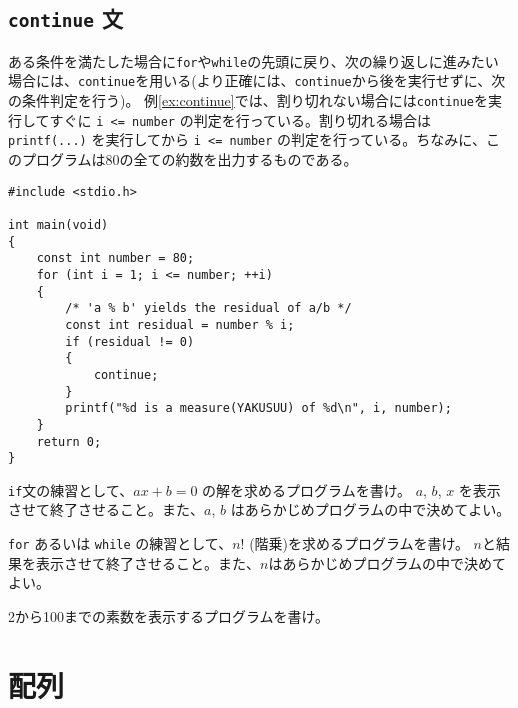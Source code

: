 \subsection{\texttt{continue} 文}
ある条件を満たした場合に\texttt{for}や\texttt{while}の先頭に戻り、次の繰り返しに進みたい場合には、\texttt{continue}を用いる(より正確には、\texttt{continue}から後を実行せずに、次の条件判定を行う)。 例\ref{ex:continue}では、割り切れない場合には\texttt{continue}を実行してすぐに \texttt{i <= number} の判定を行っている。割り切れる場合は \texttt{printf(...)} を実行してから \texttt{i <= number} の判定を行っている。ちなみに、このプログラムは80の全ての約数を出力するものである。
\begin{reidai}\label{ex:continue}
    \begin{verbatim}
#include <stdio.h>

int main(void)
{
    const int number = 80;
    for (int i = 1; i <= number; ++i)
    {
        /* 'a % b' yields the residual of a/b */
        const int residual = number % i;
        if (residual != 0)
        {
            continue;
        }
        printf("%d is a measure(YAKUSUU) of %d\n", i, number);
    }
    return 0;
}
\end{verbatim}
\end{reidai}
\begin{renshuu}\label{prob:2-1}
    \texttt{if}文の練習として、\(ax+b=0\) の解を求めるプログラムを書け。
    \(a\), \(b\), \(x\) を表示させて終了させること。また、\(a\), \(b\) はあらかじめプログラムの中で決めてよい。
\end{renshuu}

\begin{renshuu}\label{prob:2-2}
    \texttt{for} あるいは \texttt{while} の練習として、\(n!\) (階乗)を求めるプログラムを書け。
    \(n\)と結果を表示させて終了させること。また、\(n\)はあらかじめプログラムの中で決めてよい。
\end{renshuu}

\begin{renshuu}\label{prob:2-3}
    2から100までの素数を表示するプログラムを書け。
\end{renshuu}

\section{配列}
